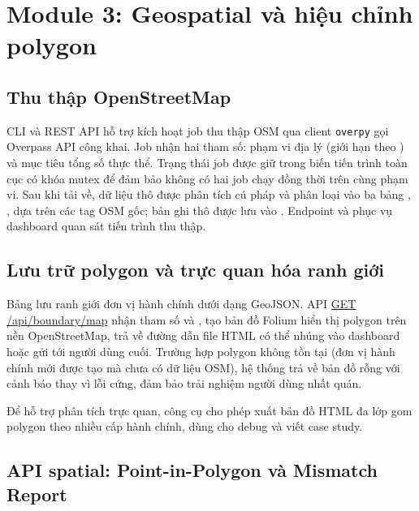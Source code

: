 \section{Module 3: Geospatial và hiệu chỉnh polygon}
\label{sec:geospatial}

\subsection{Thu thập OpenStreetMap}
\label{sec:osm-collection}

CLI và REST API hỗ trợ kích hoạt job thu thập OSM qua client \texttt{overpy} gọi Overpass API \cite{OSM2024Overpass} công khai. Job nhận hai tham số: phạm vi địa lý (giới hạn theo ) và mục tiêu tổng số thực thể. Trạng thái job được giữ trong biến tiến trình toàn cục có khóa mutex để đảm bảo không có hai job chạy đồng thời trên cùng phạm vi. Sau khi tải về, dữ liệu thô được phân tích cú pháp và phân loại vào ba bảng , ,  dựa trên các tag OSM gốc; bản ghi thô được lưu vào . Endpoint  và  phục vụ dashboard quan sát tiến trình thu thập.

\subsection{Lưu trữ polygon và trực quan hóa ranh giới}
\label{sec:polygon-storage}

Bảng  lưu ranh giới đơn vị hành chính dưới dạng GeoJSON. API \url{GET /api/boundary/map} nhận tham số  và , tạo bản đồ Folium \cite{Folium2024} hiển thị polygon trên nền OpenStreetMap, trả về đường dẫn file HTML có thể nhúng vào dashboard hoặc gửi tới người dùng cuối. Trường hợp polygon không tồn tại (đơn vị hành chính mới được tạo mà chưa có dữ liệu OSM), hệ thống trả về bản đồ rỗng với cảnh báo thay vì lỗi cứng, đảm bảo trải nghiệm người dùng nhất quán.

Để hỗ trợ phân tích trực quan, công cụ  cho phép xuất bản đồ HTML đa lớp gom polygon theo nhiều cấp hành chính, dùng cho debug và viết case study.

\subsection{API spatial: Point-in-Polygon và Mismatch Report}
\label{sec:spatial-api}

